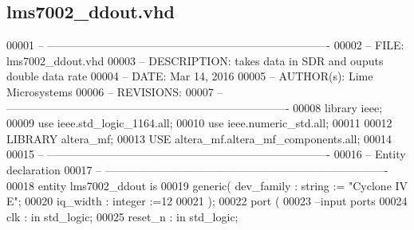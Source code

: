 \subsection{lms7002\+\_\+ddout.\+vhd}
\label{tx__modules_2lms7002__ddout_8vhd_source}

\begin{DoxyCode}
00001 \textcolor{keyword}{-- ---------------------------------------------------------------------------- }
00002 \textcolor{keyword}{-- FILE:    lms7002\_ddout.vhd}
00003 \textcolor{keyword}{-- DESCRIPTION: takes data in SDR and ouputs double data rate}
00004 \textcolor{keyword}{-- DATE:    Mar 14, 2016}
00005 \textcolor{keyword}{-- AUTHOR(s):   Lime Microsystems}
00006 \textcolor{keyword}{-- REVISIONS:}
00007 \textcolor{keyword}{-- ---------------------------------------------------------------------------- }
00008 \textcolor{vhdlkeyword}{library }\textcolor{keywordflow}{ieee};
00009 \textcolor{vhdlkeyword}{use }ieee.std\_logic\_1164.\textcolor{keywordflow}{all};
00010 \textcolor{vhdlkeyword}{use }ieee.numeric\_std.\textcolor{keywordflow}{all};
00011 
00012 \textcolor{vhdlkeyword}{LIBRARY }\textcolor{keywordflow}{altera\_mf};
00013 \textcolor{vhdlkeyword}{USE }altera_mf.altera\_mf\_components.\textcolor{keywordflow}{all};
00014 
00015 \textcolor{keyword}{-- ----------------------------------------------------------------------------}
00016 \textcolor{keyword}{-- Entity declaration}
00017 \textcolor{keyword}{-- ----------------------------------------------------------------------------}
00018 \textcolor{keywordflow}{entity }lms7002_ddout \textcolor{keywordflow}{is}
00019     \textcolor{keywordflow}{generic}\textcolor{vhdlchar}{(} \textcolor{vhdlchar}{dev_family} \textcolor{vhdlchar}{:} \textcolor{comment}{string} \textcolor{vhdlchar}{:=} \textcolor{keyword}{"Cyclone IV E"};
00020                 \textcolor{vhdlchar}{iq_width}        \textcolor{vhdlchar}{:} \textcolor{comment}{integer} \textcolor{vhdlchar}{:=}\textcolor{vhdllogic}{}\textcolor{vhdllogic}{12}
00021     \textcolor{vhdlchar}{)};
00022     \textcolor{keywordflow}{port} \textcolor{vhdlchar}{(}
00023 \textcolor{keyword}{      --input ports }
00024       \textcolor{vhdlchar}{clk}           \textcolor{vhdlchar}{:} \textcolor{keywordflow}{in} \textcolor{comment}{std\_logic};
00025       \textcolor{vhdlchar}{reset_n}       \textcolor{vhdlchar}{:} \textcolor{keywordflow}{in} \textcolor{comment}{std\_logic};

\end{DoxyCode}
